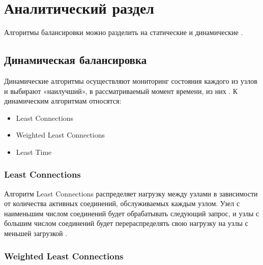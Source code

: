 \chapter{Аналитический раздел}
Алгоритмы балансировки можно разделить на статические и динамические \cite{uzel}.
\section{Динамическая балансировка}
Динамические алгоритмы осуществляют мониторинг состояния каждого
из узлов и выбирают «наилучший», в рассматриваемый момент времени, из них \cite{webmanage}. К динамическим алгоритмам относятся:
\begin{itemize}
	\item Least Connections
	\item Weighted Least Connections
	\item Least Time
\end{itemize}
\subsection{Least Connections}
Алгоритм Least Connections распределяет нагрузку между узлами в зависимости от количества активных соединений, обслуживаемых каждым узлом. Узел с наименьшим числом соединений будет обрабатывать следующий запрос, и узлы с большим числом соединений будет перераспределять свою нагрузку на узлы с меньшей загрузкой \cite{leastconnection}. 



\subsection{Weighted Least Connections}

